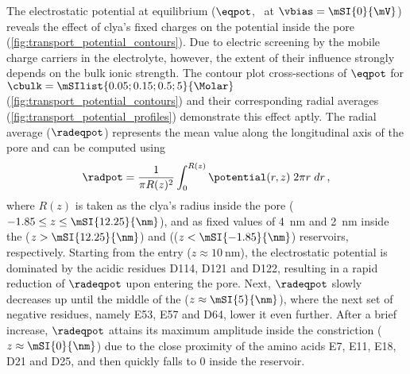 The electrostatic potential at equilibrium ($\eqpot$, \ie~at $\vbias = \mSI{0}{\mV}$) reveals the effect of
\gls{clya}'s fixed charges on the potential inside the pore (\cref{fig:transport_potential_contours}). Due to
electric screening by the mobile charge carriers in the electrolyte, however, the extent of their influence
strongly depends on the bulk ionic strength. The contour plot cross-sections of $\eqpot$ for $\cbulk =
\mSIlist{0.05;0.15;0.5;5}{\Molar}$ (\cref{fig:transport_potential_contours}) and their corresponding radial
averages (\cref{fig:transport_potential_profiles}) demonstrate this effect aptly. The radial average
($\radeqpot$) represents the mean value along the longitudinal axis of the pore and can be computed using
%
\begin{align}
  \radpot=\dfrac{1}{\pi R(z)^2}\int_{0}^{R(z)}\potential(r,z) \;2 \pi r \; dr \text{\,,}
\end{align}
%
where $R(z)$ is taken as the \gls{clya}'s radius inside the pore ($-1.85 \le z \le \mSI{12.25}{\nm}$), and as
fixed values of \SI{4}{\nm} and \SI{2}{\nm} inside the \cisi{} ($z > \mSI{12.25}{\nm}$) and \transi{} (($z <
\mSI{-1.85}{\nm}$) reservoirs, respectively. Starting from the \cisi{} entry ($z \approx \SI{10}{\nm}$), the
electrostatic potential is dominated by the acidic residues D114, D121 and D122, resulting in a rapid
reduction of $\radeqpot$ upon entering the pore. Next, $\radeqpot$ slowly decreases up until the middle of the
\lumen{} ($z \approx \mSI{5}{\nm}$), where the next set of negative residues, namely E53, E57 and D64, lower
it even further. After a brief increase, $\radeqpot$ attains its maximum amplitude inside the \transi{}
constriction ($z \approx \mSI{0}{\nm}$) due to the close proximity of the amino acids E7, E11, E18, D21 and
D25, and then quickly falls to \num{0} inside the \transi{} reservoir.

